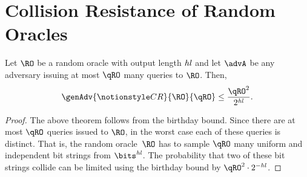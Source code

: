 \section{Collision Resistance of Random Oracles}
\label{app:coll-res-ro}

\begin{theorem}\label{thm:coll-res-ro}
	Let $\RO$ be a random oracle with output length $\mathit{hl}$ and let $\advA$ be any adversary issuing at most $\qRO$ many queries to $\RO$.
	Then,
	\[
		\genAdv{\CR}{\RO}{\qRO} \leq \frac{\qRO^2}{2^\hashlen}.
	\]
\end{theorem}

\begin{proof}
	The above theorem follows from the birthday bound.
	Since there are at most $\qRO$ queries issued to $\RO$, in the worst case each of these queries is distinct.
	That is, the random oracle~$\RO$ has to sample $\qRO$ many uniform and independent bit strings from $\bits^\hashlen$.
	The probability that two of these bit strings collide can be limited using the birthday bound by $\qRO^2 \cdot 2^{-\hashlen}$.
\end{proof}